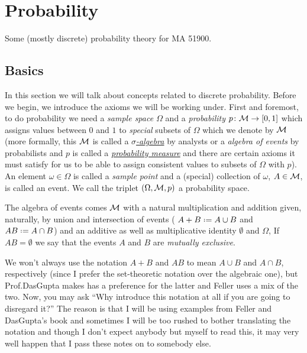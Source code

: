 \chapter{Probability}
Some (mostly discrete) probability theory for MA 51900.

\section{Basics}
In this section we will talk about concepts related to discrete
probability. Before we begin, we introduce the axioms we will be working
under. First and foremost, to do probability we need a \emph{sample space
  \(\Omega\)} and a \emph{probability \(p\colon\mathcal{M}\to[0,1]\)} which
assigns values between \(0\) and \(1\) to \emph{special} subsets of
\(\Omega\) which we denote by \(\mathcal{M}\) (more formally, this \(\mathcal{M}\) is
called a
\href{https://en.wikipedia.org/wiki/Sigma-algebra}{\emph{\(\sigma\)-algebra}}
by analysts or a \emph{algebra of events} by probabilists and \(p\) is
called a
\href{https://en.wikipedia.org/wiki/Probability_measure}{\emph{probability
    measure}} and there are certain axioms it must satisfy for us to be
able to assign consistent values to subsets of \(\Omega\) with \(p\)). An
element \(\omega\in\Omega\) is called a \emph{sample point} and a (special)
collection of \(\omega\), \(A\in\mathcal{M}\), is called an event. We call the
triplet \((\Omega,\mathcal{M},p)\) a probability space.

The algebra of events comes \(\mathcal{M}\) with a natural multiplication and
addition given, naturally, by union and intersection of events (\ie{}
\(A+B\defeq A\cup B\) and \(AB\defeq A\cap B\)) and an additive as well as
multiplicative identity \(\emptyset\) and \(\Omega\), \etc{} If
\(AB=\emptyset\) we say that the events \(A\) and \(B\) are \emph{mutually
  exclusive}.
\begin{remark}
  We won't always use the notation \(A+B\) and \(AB\) to mean \(A\cup B\)
  and \(A\cap B\), respectively (since I prefer the set-theoretic notation
  over the algebraic one), but Prof.\@ DasGupta makes has a preference for
  the latter and Feller uses a mix of the two. Now, you may ask ``Why
  introduce this notation at all if you are going to disregard it?'' The
  reason is that I will be using examples from Feller and DasGupta's book
  and sometimes I will be too rushed to bother translating the notation and
  though I don't expect anybody but myself to read this, it may very well
  happen that I pass these notes on to somebody else.
\end{remark}

